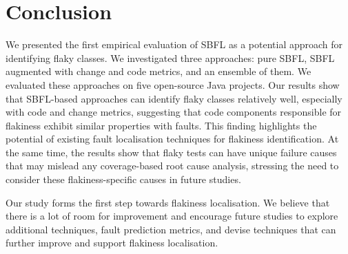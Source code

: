 \section{Conclusion}
\label{sec:sherloc-conclusion}


We presented the first empirical evaluation of SBFL as a potential approach for identifying flaky classes. We investigated three approaches: pure SBFL, SBFL augmented with change and code metrics, and an ensemble of them. 
We evaluated these approaches on five open-source Java projects. Our results show that SBFL-based approaches can identify flaky classes relatively well, especially with code and change metrics, suggesting that code components responsible for flakiness exhibit similar properties with faults. This finding highlights the potential of existing fault localisation techniques for flakiness identification. At the same time, the results show that flaky tests can have unique failure causes that may mislead any coverage-based root cause analysis, stressing the need to consider these flakiness-specific causes in future studies.
%     
%    
%    

Our study forms the first step towards flakiness localisation. We believe that there is a lot of room for improvement and encourage future studies to explore additional techniques, fault prediction metrics, and devise techniques that can further improve and support flakiness localisation. 
